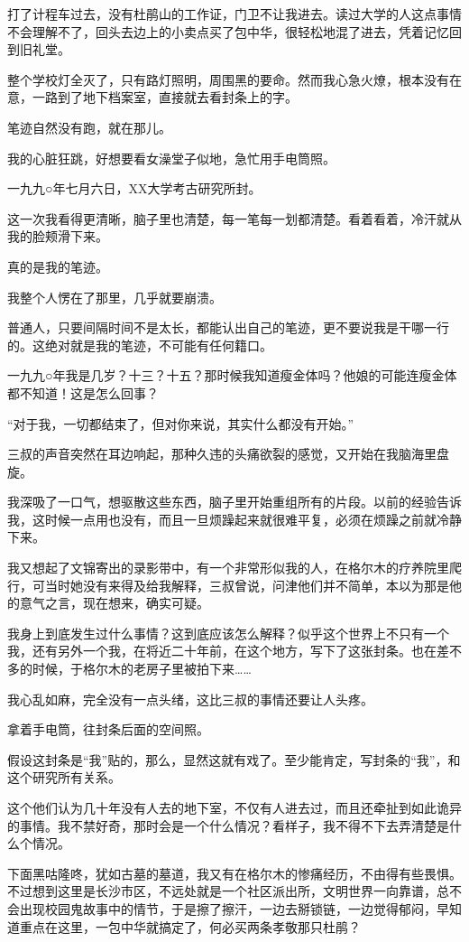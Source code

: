 打了计程车过去，没有杜鹃山的工作证，门卫不让我进去。读过大学的人这点事情不会理解不了，回头去边上的小卖点买了包中华，很轻松地混了进去，凭着记忆回到旧礼堂。

整个学校灯全灭了，只有路灯照明，周围黑的要命。然而我心急火燎，根本没有在意，一路到了地下档案室，直接就去看封条上的字。

笔迹自然没有跑，就在那儿。

我的心脏狂跳，好想要看女澡堂子似地，急忙用手电筒照。

一九九○年七月六日，XX大学考古研究所封。

这一次我看得更清晰，脑子里也清楚，每一笔每一划都清楚。看着看着，冷汗就从我的脸颊滑下来。

真的是我的笔迹。

我整个人愣在了那里，几乎就要崩溃。

普通人，只要间隔时间不是太长，都能认出自己的笔迹，更不要说我是干哪一行的。这绝对就是我的笔迹，不可能有任何籍口。

一九九○年我是几岁？十三？十五？那时候我知道瘦金体吗？他娘的可能连瘦金体都不知道！这是怎么回事？

“对于我，一切都结束了，但对你来说，其实什么都没有开始。”

三叔的声音突然在耳边响起，那种久违的头痛欲裂的感觉，又开始在我脑海里盘旋。

我深吸了一口气，想驱散这些东西，脑子里开始重组所有的片段。以前的经验告诉我，这时候一点用也没有，而且一旦烦躁起来就很难平复，必须在烦躁之前就冷静下来。

我又想起了文锦寄出的录影带中，有一个非常形似我的人，在格尔木的疗养院里爬行，可当时她没有来得及给我解释，三叔曾说，问津他们并不简单，本以为那是他的意气之言，现在想来，确实可疑。

我身上到底发生过什么事情？这到底应该怎么解释？似乎这个世界上不只有一个我，还有另外一个我，在将近二十年前，在这个地方，写下了这张封条。也在差不多的时候，于格尔木的老房子里被拍下来……

我心乱如麻，完全没有一点头绪，这比三叔的事情还要让人头疼。

拿着手电筒，往封条后面的空间照。

假设这封条是“我”贴的，那么，显然这就有戏了。至少能肯定，写封条的“我”，和这个研究所有关系。

这个他们认为几十年没有人去的地下室，不仅有人进去过，而且还牵扯到如此诡异的事情。我不禁好奇，那时会是一个什么情况？看样子，我不得不下去弄清楚是什么个情况。

下面黑咕隆咚，犹如古墓的墓道，我又有在格尔木的惨痛经历，不由得有些畏惧。不过想到这里是长沙市区，不远处就是一个社区派出所，文明世界一向靠谱，总不会出现校园鬼故事中的情节，于是擦了擦汗，一边去掰锁链，一边觉得郁闷，早知道重点在这里，一包中华就搞定了，何必买两条孝敬那只杜鹃？

